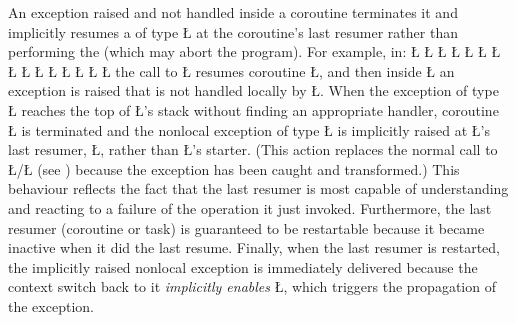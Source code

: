 \documentclass[openright,twoside]{report}
\begin{document}
An exception raised and not handled inside a coroutine terminates it and implicitly resumes a  of type \LGinlinetrue\LGbegin\lgrinde\L{}\endlgrinde\LGend{} at the coroutine's last resumer rather than performing the  (which may abort the program).
For example, in:
\LGinlinefalse\LGbegin\lgrinde
\L{}
\L{\LB{}}
\L{}
\L{\LB{}}
\L{}
\L{\LB{}}
\L{\LB{\};}}
\L{}
\L{\LB{}}
\L{\LB{}}
\L{\LB{}}
\L{\LB{}}
\L{\LB{}}
\L{\LB{}}
\L{\LB{\}}}
\endlgrinde\LGend
the call to \LGinlinetrue\LGbegin\lgrinde\L{}\endlgrinde\LGend{} resumes coroutine \LGinlinetrue\LGbegin\lgrinde\L{}\endlgrinde\LGend{}, and then inside \LGinlinetrue\LGbegin\lgrinde\L{}\endlgrinde\LGend{} an exception is raised that is not handled locally by \LGinlinetrue\LGbegin\lgrinde\L{}\endlgrinde\LGend{}.
When the exception of type \LGinlinetrue\LGbegin\lgrinde\L{}\endlgrinde\LGend{} reaches the top of \LGinlinetrue\LGbegin\lgrinde\L{}\endlgrinde\LGend{}'s stack without finding an appropriate handler, coroutine \LGinlinetrue\LGbegin\lgrinde\L{}\endlgrinde\LGend{} is terminated and the nonlocal exception of type \LGinlinetrue\LGbegin\lgrinde\L{}\endlgrinde\LGend{} is implicitly raised at \LGinlinetrue\LGbegin\lgrinde\L{}\endlgrinde\LGend{}'s last resumer, \LGinlinetrue\LGbegin\lgrinde\L{}\endlgrinde\LGend{}, rather than \LGinlinetrue\LGbegin\lgrinde\L{}\endlgrinde\LGend{}'s starter.
(This action replaces the normal call to \LGinlinetrue\LGbegin\lgrinde\L{}\endlgrinde\LGend{}/\LGinlinetrue\LGbegin\lgrinde\L{}\endlgrinde\LGend{} (see ) because the exception has been caught and transformed.)
This behaviour reflects the fact that the last resumer is most capable of understanding and reacting to a failure of the operation it just invoked.
Furthermore, the last resumer (coroutine or task) is guaranteed to be restartable because it became inactive when it did the last resume.
Finally, when the last resumer is restarted, the implicitly raised nonlocal exception is immediately delivered because the context switch back to it \emph{implicitly enables} \LGinlinetrue\LGbegin\lgrinde\L{}\endlgrinde\LGend{}, which triggers the propagation of the exception.
\end{document}
